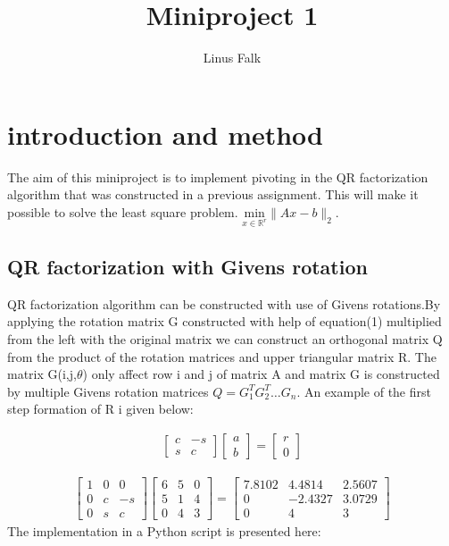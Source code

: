 \documentclass[a4paper]{article}
\title{Miniproject 1}
\author{Linus Falk}
\begin{document}
\maketitle
\section{introduction and method}
The aim of this miniproject is to implement pivoting in the QR factorization algorithm that was constructed in a previous assignment. This will make it possible to solve the least square problem. $\underset{x \in \mathbb{R}^{r}}{\text{min}}\|Ax-b\|_2$.

\subsection{QR factorization with Givens rotation}
QR factorization algorithm can be constructed with use of Givens rotations.By applying the rotation matrix G constructed with help of equation(1) multiplied from the left with the original matrix  we can construct an orthogonal matrix Q from the product of the rotation matrices  and  upper triangular matrix R. The matrix G(i,j,$\theta$) only affect row i and j of matrix A and matrix G is constructed by multiple Givens rotation matrices $Q = G^{T}_1G^{T}_2 \ldots G_n$. An example of the first step formation of R i given below: \citep{givens}


\begin{equation}
	\begin{aligned}
		\begin{bmatrix} c& -s\\ s& c \end{bmatrix}\begin{bmatrix}  a \\b \end{bmatrix} = \begin{bmatrix} r \\ 0 \end{bmatrix}  
	\end{aligned}
	\label{eq.1}
\end{equation}

\begin{equation}
	\begin{aligned}
		\begin{bmatrix} 1& 0& 0 \\
		0& c& -s \\
		0& s& c \end{bmatrix}
		\begin{bmatrix} 6& 5& 0 \\
		5& 1& 4\\
		0& 4& 3\end{bmatrix} 
			= \begin{bmatrix}7.8102& 4.4814& 2.5607\\
		0& -2.4327& 3.0729\\
		0& 4& 3 \end{bmatrix}
		\end{aligned}
	\end{equation}
The implementation in a Python script is presented here:
\end{document}
